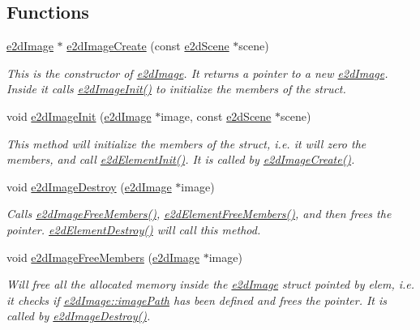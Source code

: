 \subsection*{Functions}
\begin{DoxyCompactItemize}
\item 
\hyperlink{structe2dImage}{e2d\-Image} $\ast$ \hyperlink{group__e2dImage_gafc7e085a237f8d2f1b147b3cca8259d6}{e2d\-Image\-Create} (const \hyperlink{structe2dScene}{e2d\-Scene} $\ast$scene)
\begin{DoxyCompactList}\small\item\em This is the constructor of \hyperlink{structe2dImage}{e2d\-Image}. It returns a pointer to a new \hyperlink{structe2dImage}{e2d\-Image}. Inside it calls \hyperlink{group__e2dImage_ga11703b45867fb00d56489a3a6bc6bb9c}{e2d\-Image\-Init()} to initialize the members of the struct. \end{DoxyCompactList}\item 
void \hyperlink{group__e2dImage_ga11703b45867fb00d56489a3a6bc6bb9c}{e2d\-Image\-Init} (\hyperlink{structe2dImage}{e2d\-Image} $\ast$image, const \hyperlink{structe2dScene}{e2d\-Scene} $\ast$scene)
\begin{DoxyCompactList}\small\item\em This method will initialize the members of the struct, i.\-e. it will zero the members, and call \hyperlink{group__e2dElement_ga8734d10ef40a380dfc51bfe1790a92a7}{e2d\-Element\-Init()}. It is called by \hyperlink{group__e2dImage_gafc7e085a237f8d2f1b147b3cca8259d6}{e2d\-Image\-Create()}. \end{DoxyCompactList}\item 
void \hyperlink{group__e2dImage_gacf174e48578f0e23888e37f47a3ef10b}{e2d\-Image\-Destroy} (\hyperlink{structe2dImage}{e2d\-Image} $\ast$image)
\begin{DoxyCompactList}\small\item\em Calls \hyperlink{group__e2dImage_gaf5409c0b10e8a8d8b9bd3f08e1d5da1f}{e2d\-Image\-Free\-Members()}, \hyperlink{group__e2dElement_gae8da5104d70a09549ca74044dda8313c}{e2d\-Element\-Free\-Members()}, and then frees the pointer. \hyperlink{group__e2dElement_ga214c437a16fe6f3fc795539f851a2019}{e2d\-Element\-Destroy()} will call this method. \end{DoxyCompactList}\item 
void \hyperlink{group__e2dImage_gaf5409c0b10e8a8d8b9bd3f08e1d5da1f}{e2d\-Image\-Free\-Members} (\hyperlink{structe2dImage}{e2d\-Image} $\ast$image)
\begin{DoxyCompactList}\small\item\em Will free all the allocated memory inside the \hyperlink{structe2dImage}{e2d\-Image} struct pointed by elem, i.\-e. it checks if \hyperlink{structe2dImage_afb14ab23ba86115c3b01ad4122943f89}{e2d\-Image\-::image\-Path} has been defined and frees the pointer. It is called by \hyperlink{group__e2dImage_gacf174e48578f0e23888e37f47a3ef10b}{e2d\-Image\-Destroy()}. \end{DoxyCompactList}\item 

\end{DoxyCompactItemize}
